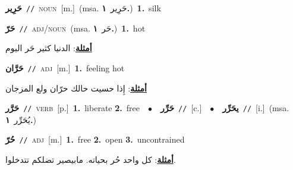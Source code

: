 \documentclass[10pt,a4paper,twoside]{article} %
\begin{document}
\begin{multicols}{2}
{\setlength\topsep{0pt}\textbf{\foreignlanguage{arabic}{حَرِير}}\ {\color{gray}\texttt{//}\color{black}}\ \textsc{noun}\ [m.]\ \color{gray}(msa. \foreignlanguage{arabic}{حَرِير}~\foreignlanguage{arabic}{\textbf{١.}})\color{black}\ \textbf{1.}~silk\ } \vspace{2mm}

{\setlength\topsep{0pt}\textbf{\foreignlanguage{arabic}{حَرّ}}\ {\color{gray}\texttt{//}\color{black}}\ \textsc{adj/noun}\ \color{gray}(msa. \foreignlanguage{arabic}{حَر}~\foreignlanguage{arabic}{\textbf{١.}})\color{black}\ \textbf{1.}~hot\  \begin{flushright}\color{gray}\foreignlanguage{arabic}{\textbf{\underline{\foreignlanguage{arabic}{أمثلة}}}: الدنيا كثير حَر اليوم}\end{flushright}\color{black}} \vspace{2mm}

{\setlength\topsep{0pt}\textbf{\foreignlanguage{arabic}{حَرَّان}}\ {\color{gray}\texttt{//}\color{black}}\ \textsc{adj}\ [m.]\ \textbf{1.}~feeling hot\  \begin{flushright}\color{gray}\foreignlanguage{arabic}{\textbf{\underline{\foreignlanguage{arabic}{أمثلة}}}: إِذا حسيت حالك حرّان ولع المزجان}\end{flushright}\color{black}} \vspace{2mm}

{\setlength\topsep{0pt}\textbf{\foreignlanguage{arabic}{حَرَّر}}\ {\color{gray}\texttt{//}\color{black}}\ \textsc{verb}\ [p.]\ \textbf{1.}~liberate  \textbf{2.}~free\ \ $\bullet$\ \ \setlength\topsep{0pt}\textbf{\foreignlanguage{arabic}{حَرِّر}}\ {\color{gray}\texttt{//}\color{black}}\ [c.]\ \ $\bullet$\ \ \setlength\topsep{0pt}\textbf{\foreignlanguage{arabic}{يحَرِّر}}\ {\color{gray}\texttt{//}\color{black}}\ [i.]\ \color{gray}(msa. \foreignlanguage{arabic}{يُحَرِّر}~\foreignlanguage{arabic}{\textbf{١.}})\color{black}\ } \vspace{2mm}

{\setlength\topsep{0pt}\textbf{\foreignlanguage{arabic}{حُرّ}}\ {\color{gray}\texttt{//}\color{black}}\ \textsc{adj}\ [m.]\ \textbf{1.}~free  \textbf{2.}~open  \textbf{3.}~uncontrained\  \begin{flushright}\color{gray}\foreignlanguage{arabic}{\textbf{\underline{\foreignlanguage{arabic}{أمثلة}}}: كل واحد حُر بحياته. مابيصير تضلكم تتدخلوا.}\end{flushright}\color{black}} \vspace{2mm}


\end{multicols}
\end{document}
